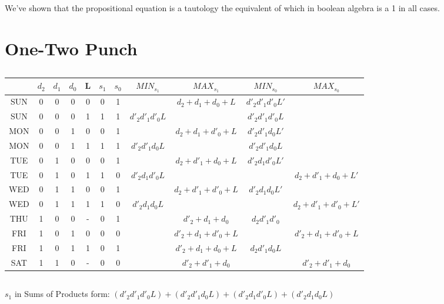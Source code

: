\documentclass[11pt]{article}
\begin{document}
\subsection{} %
We've shown that the propositional equation is a tautology the equivalent of which in boolean algebra is a 1 in all cases.  

\section{One-Two Punch} %
\subsection{} %
\begin{center}
\begin{tabular}{ c|ccc|c|cc|cc|cc } 
	& $d_2$ & $d_1$ & $d_0$ & L & $s_1$ & $s_0$ & $MIN_{s_1}$ & $MAX_{s_1}$ & $MIN_{s_0}$ & $MAX_{s_0}$ \\
	\hline
	SUN & 0 & 0 & 0 & 0 & 0 & 1 & & $d_2+d_1+d_0+L$ & $d'_2d'_1d'_0L'$ & \\
	SUN & 0 & 0 & 0 & 1 & 1 & 1 & $d'_2d'_1d'_0L$ & & $d'_2d'_1d'_0L$ & \\
	MON & 0 & 0 & 1 & 0 & 0 & 1 & & $d_2+d_1+d'_0+L$ & $d'_2d'_1d_0L'$ & \\
	MON & 0 & 0 & 1 & 1 & 1 & 1 & $d'_2d'_1d_0L$ & & $d'_2d'_1d_0L$ & \\
	TUE & 0 & 1 & 0 & 0 & 0 & 1 & & $d_2+d'_1+d_0+L$ & $d'_2d_1d'_0L'$ & \\
	TUE & 0 & 1 & 0 & 1 & 1 & 0 & $d'_2d_1d'_0L$ & & & $d_2+d'_1+d_0+L'$ \\
	WED & 0 & 1 & 1 & 0 & 0 & 1 & & $d_2+d'_1+d'_0+L$ & $d'_2d_1d_0L'$ & \\
	WED & 0 & 1 & 1 & 1 & 1 & 0 & $d'_2d_1d_0L$ & & & $d_2+d'_1+d'_0+L'$ \\
	THU & 1 & 0 & 0 & - & 0 & 1 & & $d'_2+d_1+d_0$& $d_2d'_1d'_0$ & \\
	FRI & 1 & 0 & 1 & 0 & 0 & 0 & & $d'_2+d_1+d'_0+L$ & & $d'_2+d_1+d'_0+L$ \\
	FRI & 1 & 0 & 1 & 1 & 0 & 1 & & $d'_2+d_1+d_0+L$ & $d_2d'_1d_0L$ & \\
	SAT & 1 & 1 & 0 & - & 0 & 0 & & $d'_2+d'_1+d_0$ & & $d'_2+d'_1+d_0$ \\
\end{tabular}
\end{center}
\subsection{} %
$s_1$ in Sums of Products form:
$(d'_2d'_1d'_0L) + (d'_2d'_1d_0L) + (d'_2d_1d'_0L) + (d'_2d_1d_0L)$
\end{document}
